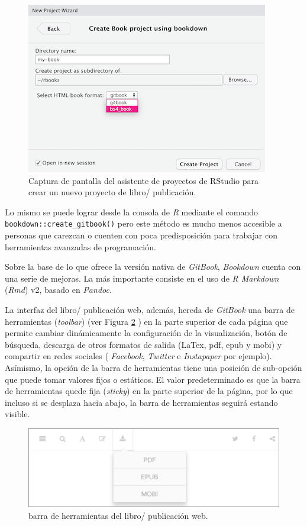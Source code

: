 \documentclass[
]{book}
\begin{document}
\begin{figure}

{\centering \includegraphics{images/new-bs4-book} 

}

\caption{Captura de pantalla del asistente de proyectos de RStudio para crear un nuevo proyecto de libro/ publicación.}\label{fig:new-bs4-book}
\end{figure}

Lo mismo se puede lograr desde la consola de \emph{R} mediante el comando \texttt{bookdown::create\_gitbook()} pero este método es mucho menos accesible a personas que carezcan o cuenten con poca predisposición para trabajar con herramientas avanzadas de programación.

Sobre la base de lo que ofrece la versión nativa de \emph{GitBook}, \emph{Bookdown} cuenta con una serie de mejoras. La más importante consiste en el uso de \emph{R Markdown} (\emph{Rmd}) v2, basado en \emph{Pandoc}.

La interfaz del libro/ publicación web, además, hereda de \emph{GitBook} una barra de herramientas (\emph{toolbar}) (ver Figura \ref{fig:gitbook} ) en la parte superior de cada página que permite cambiar dinámicamente la configuración de la visualización, botón de búsqueda, descarga de otros formatos de salida (LaTex, pdf, epub y mobi) y compartir en redes sociales ( \emph{Facebook}, \emph{Twitter} e \emph{Instapaper} por ejemplo). Asímismo, la opción de la barra de herramientas tiene una posición de sub-opción que puede tomar valores fijos o estáticos. El valor predeterminado es que la barra de herramientas quede fija (\emph{sticky}) en la parte superior de la página, por lo que incluso si se desplaza hacia abajo, la barra de herramientas seguirá estando visible.

\begin{figure}
\includegraphics[width=1\linewidth]{images/gitbook} \caption{barra de herramientas del libro/ publicación web. }\label{fig:gitbook}
\end{figure}
\end{document}
